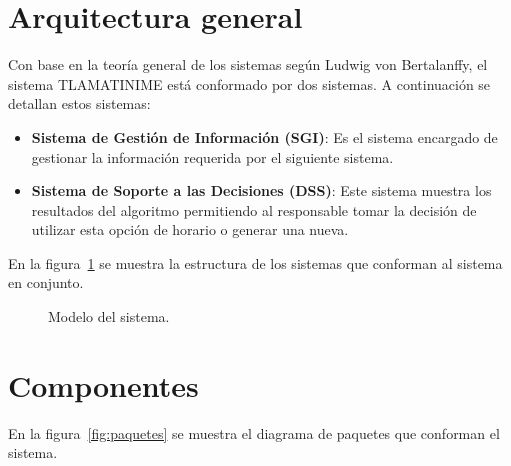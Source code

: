 \label{sec:bosquejoGeneral}

\section{Arquitectura general}

Con base en la teoría general de los sistemas según Ludwig von Bertalanffy, el sistema TLAMATINIME está conformado por dos sistemas. A continuación se detallan estos sistemas:

\begin{itemize}
	\item \textbf{Sistema de Gestión de Información (SGI)}: Es el sistema encargado de gestionar la información requerida por el siguiente sistema.
	
	\item \textbf{Sistema de Soporte a las Decisiones (DSS)}: Este sistema muestra los resultados del algoritmo permitiendo al responsable tomar la decisión de utilizar esta opción de horario o generar una nueva.
\end{itemize}

En la figura~\ref{fig:sistemaT} se muestra la estructura de los sistemas que conforman al sistema en conjunto.

\begin{figure}[htbp!]
	\begin{center}
		\caption{Modelo del sistema.}
		\label{fig:sistemaT}
	\end{center}
\end{figure}



\section{Componentes}

En la figura~\ref{fig:paquetes} se muestra el diagrama de paquetes que conforman el sistema.

